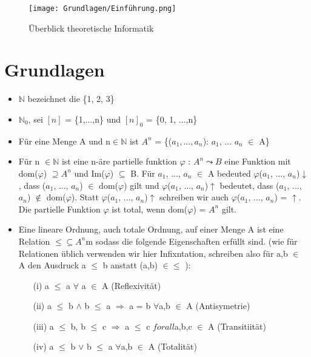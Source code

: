 \begin{figure}
    \centering
    \texttt{[image: Grundlagen/Einführung.png]}
    \caption{Überblick theoretische Informatik}
    \label{fig:example}
\end{figure}

\section{Grundlagen}

\begin{itemize}
    \item $\mathbb{N}$ bezeichnet die \{1, 2, 3\}
    \item $\mathbb{N}_{0}$, sei $[n]$ = \{1,$\ldots $,n\} und $[n]_{0}$ = \{0, 1, $\ldots $,n\} 
    \item Für eine Menge A und n$\in \mathbb{N}$ ist $A^{n}$ = \{($a_{1},\ldots, a_{n}$): $a_{1}$, $\ldots$ $a_{n}$ $\in$ A\}
    \item Für n $\in \mathbb{N}$ ist eine n-äre partielle funktion $\varphi$ : $A^{n} \leadsto B $ eine Funktion mit dom($\varphi$) $\supseteq A^{n}$ und Im($\varphi$) $\subseteq$ B. 
    Für $a_{1}$, ..., $a_{n}$ $\in$ A bedeuted $\varphi$($a_{1}$, ..., $a_{n}$)$\downarrow$, dass ($a_{1}$, ..., $a_{n}$) $\in$ dom($\varphi$) gilt und $\varphi$($a_{1}$, ..., $a_{n}$)$\uparrow$ bedeutet, 
    dass ($a_{1}$, ..., $a_{n}$) $\notin$ dom($\varphi$). Statt $\varphi$($a_{1}$, ..., $a_{n}$)$\uparrow$ schreiben wir auch $\varphi$($a_{1}$, ..., $a_{n}$) = $\uparrow$.
    Die partielle Funktion $\varphi$ ist total, wenn dom($\varphi$) = $A^{n}$ gilt.
    \item Eine lineare Ordnung, auch totale Ordnung, auf einer Menge A ist eine Relation $\leq  \subseteq  A^{n}$m sodass die folgende Eigenschaften erfüllt sind. 
    (wie für Relationen üblich verwenden wir hier Infixntation, schreiben also für a,b $\in$ A den Ausdruck a $\leq $ b anstatt (a,b) $\in \leq $ ): 
    \begin{enumerate}
        \item[(i)] a $\leq $ a $\forall$ a $\in$ A (Reflexivität)
        \item[(ii)] a $\leq $ b $ \land $ b $\leq $ a $\Rightarrow $ a = b $\forall$a,b $\in$ A (Antisymetrie)
        \item[(iii)] a $\leq $ b, b $\leq $ c $\Rightarrow$ a $\leq $ c $forall$a,b,c $\in$ A (Transitiität)
        \item[(iv)] a $\leq $ b $\vee$ b $\leq $ a $\forall$a,b $\in$ A (Totalität)
    \end{enumerate} 
\end{itemize}

